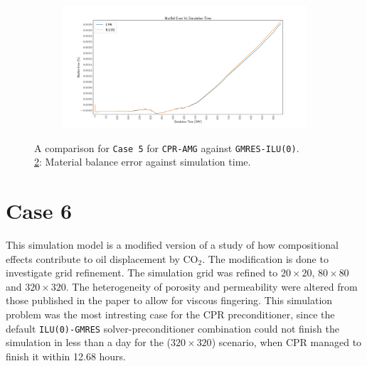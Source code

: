 \begin{figure}
\centering
\begin{subfigure}[b]{\textwidth}
   \includegraphics[width=1\linewidth]{figures/case9/matbalerr_time.pdf}
   \caption{}
   \label{case5_matbalerr}
\end{subfigure}

\caption[caption]{A comparison for \texttt{Case 5} for \texttt{CPR-AMG} against \texttt{GMRES-ILU(0)}.\\\hspace{\textwidth}
	\cref{case5_matbalerr}: Material balance error against simulation time. \\\hspace{\textwidth}}
\end{figure}

\clearpage

\section{Case 6}
This simulation model is a modified version of a study of how compositional effects contribute to oil displacement by CO$_{2}$\supercite{case6paper}.
The modification is done to investigate grid refinement. The simulation grid was refined to $20\times20$, $80\times80$ and $320\times320$.
The heterogeneity of porosity and permeability were altered from those published in the paper to allow for viscous fingering.
This simulation problem was the most intresting case for the CPR preconditioner, since the default \texttt{ILU(0)-GMRES} solver-preconditioner combination
could not finish the simulation in less than a day for the ($320\times320$) scenario, when CPR managed to finish it within 12.68 hours. 

